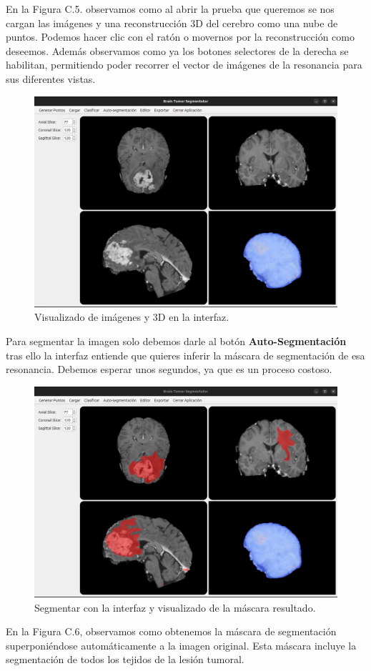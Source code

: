 En la Figura C.5. observamos como al abrir la prueba que queremos se nos cargan las imágenes y una reconstrucción 3D del cerebro como una nube de puntos. Podemos hacer clic con el ratón o movernos por la reconstrucción como deseemos.  Además observamos como ya los botones selectores de la derecha se habilitan, permitiendo poder recorrer el vector de imágenes de la resonancia para sus diferentes vistas.

\begin{figure}[H]
	\centering
	\includegraphics[width=0.7\linewidth]{imagenes/interfaz_visualizar.png}
	\caption{Visualizado de imágenes y 3D en la interfaz.}
\end{figure}

Para segmentar la imagen solo debemos darle al botón \textbf{Auto-Segmentación} tras ello la interfaz entiende que quieres inferir la máscara de segmentación de esa resonancia. Debemos esperar unos segundos, ya que es un proceso costoso.

\begin{figure}[H]
	\centering
	\includegraphics[width=0.7\linewidth]{imagenes/interfaz_mascara.png}
	\caption{Segmentar con la interfaz y visualizado de la máscara resultado.}
\end{figure}

En la Figura C.6, observamos como obtenemos la máscara de segmentación superponiéndose automáticamente a la imagen original. Esta máscara incluye la segmentación de todos los tejidos de la lesión tumoral.

